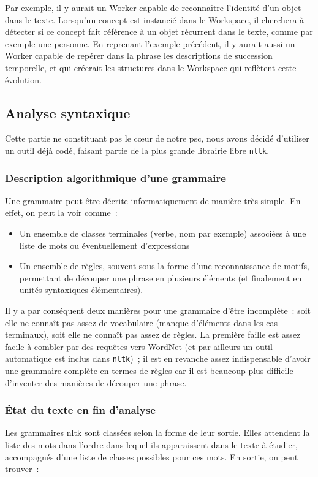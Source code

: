 \documentclass[a4paper, 12pt]{article}
\newcommand{\pyt}[1]{\texttt{#1}}%
\begin{document}
Par exemple, il y aurait un Worker capable de reconnaître l'identité d'un objet dans le texte. Lorsqu'un concept est instancié dans le Workspace, il cherchera à détecter si ce concept fait référence à un objet récurrent dans le texte, comme par exemple une personne.
En reprenant l'exemple précédent, il y aurait aussi un Worker capable de repérer dans la phrase les descriptions de succession temporelle, et qui créerait les structures dans le Workspace qui reflètent cette évolution. 


\subsection{Analyse syntaxique}

Cette partie ne constituant pas le c\oe{}ur de notre psc, nous avons décidé d'utiliser un outil déjà codé, faisant partie de la plus grande librairie libre \pyt{nltk}.

\subsubsection{Description algorithmique d'une grammaire}
Une grammaire peut être décrite informatiquement de manière très simple. En effet, on peut la voir comme~:
\begin{itemize}
	\item Un ensemble de classes terminales (verbe, nom par exemple) associées à une liste de mots ou éventuellement d'expressions
	\item Un ensemble de règles, souvent sous la forme d'une reconnaissance de motifs, permettant de découper une phrase en plusieurs éléments (et finalement en unités syntaxiques élémentaires).
\end{itemize}

Il y a par conséquent deux manières pour une grammaire d'être incomplète~: soit elle ne connaît pas assez de vocabulaire (manque d'éléments dans les cas terminaux), soit elle ne connaît pas assez de règles. La première faille est assez facile à combler par des requêtes vers WordNet (et par ailleurs un outil automatique est inclus dans \pyt{nltk})~; il est en revanche assez indispensable d'avoir une grammaire complète en termes de règles car il est beaucoup plus difficile d'inventer des manières de découper une phrase.

\subsubsection{\'Etat du texte en fin d'analyse}
Les grammaires nltk sont classées selon la forme de leur sortie. Elles attendent la liste des mots dans l'ordre dans lequel ils apparaissent dans le texte à étudier, accompagnés d'une liste de classes possibles pour ces mots. En sortie, on peut trouver~:
\end{document}
